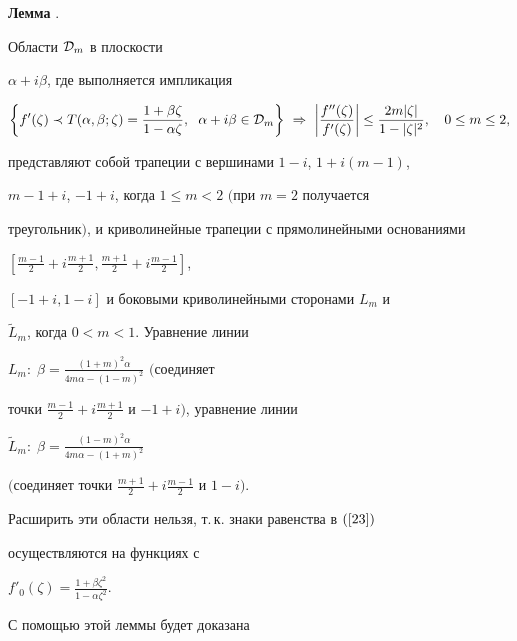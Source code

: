 {\bf Лемма} \cite{4}. {\it


Области ${\cal D}_m$ в плоскости


$\alpha+i\beta$, где выполняется импликация


\begin{equation}\label{23}


\bigg\{f'(\zeta)\prec T(\alpha,\beta;\zeta)=


\frac{1+\beta\zeta}{1-\alpha\zeta},\ \; \alpha+i\beta \in {\cal D}_m\bigg\}


\ \Rightarrow 


\ \bigg|\frac{f''(\zeta)}{f'(\zeta)}\bigg|


\leq\frac{2m|\zeta|}{1-|\zeta|^2},\quad


0\leq m\leq 2,


\end{equation}


представляют собой трапеции с вершинами $1-i$, $1+i(m-1)$,


$m-1+i$, $-1+i$, когда $1\leq m<2$ $($при $m=2$ получается


треугольник$)$, и криволинейные трапеции с прямолинейными основаниями


$[\frac{m-1}{2}+i\frac{m+1}{2},\frac{m+1}{2}+i\frac{m-1}{2}]$,


$[-1+i,1-i]$ и боковыми криволинейными сторонами ${L}_m$ и


$\widetilde{L}_m$, когда $0<m<1$. Уравнение линии


${L}_m:\;\beta=\frac{(1+m)^2\alpha}{4m\alpha-(1-m)^2}$ $($соединяет


точки $\frac{m-1}{2}+i\frac{m+1}{2}$ и $-1+i)$, уравнение линии


$\widetilde{L}_m:\;\beta=\frac{(1-m)^2\alpha}{4m\alpha-(1+m)^2}$


$($соединяет точки $\frac{m+1}{2}+i\frac{m-1}{2}$ и $1-i)$.


Расширить эти области нельзя, т.\,к. знаки равенства в $(\ref{23})$


осуществляются на функциях с


$f'_0(\zeta)=\frac{1+\beta\zeta^2}{1-\alpha\zeta^2}$.


}


\medskip





С помощью этой леммы будет доказана





